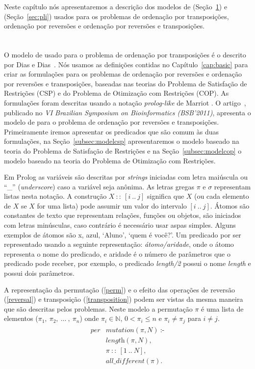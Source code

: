 Neste capítulo nós apresentaremos a descrição dos modelos de \pr{}
(Seção~\ref{sec:cp}) e \pli{} (Seção~\ref{sec:pli}) usados para os
problemas de ordenação por transposições, ordenação por reversões e
ordenação por reversões e transposições.

\section{\PR}
\label{sec:cp}
O modelo de \pr{} usado para o problema de ordenação por transposições é
o descrito por Dias e Dias~\cite{DiasDias*2009}. Nós usamos as
definições contidas no Capítulo~\ref{cap:basic} para criar as
formulações para os problemas de ordenação por reversões e ordenação por
reversões e transposições, baseadas nas teorias do Problema de
Satisfação de Restrições (CSP) e do Problema de Otimização com
Restrições (COP). As formulações foram descritas usando a notação
\textit{prolog-like} de Marriot \cite{Marriott*1998}. O
artigo~\cite{IizukaDias*2011}, publicado no \textit{VI Brazilian
Symposium on Bioinformatics (BSB'2011)}, apresenta o modelo de \pr{}
para o problema de ordenação por reversões e transposições.
Primeiramente iremos apresentar os predicados que são comum às duas
formulações, na Seção~\ref{subsec:modelcsp} apresentaremos o modelo
baseado na teoria do Problema de Satisfação de Restrições e na
Seção~\ref{subsec:modelcop} o modelo baseado na teoria do Problema de
Otimização com Restrições.

Em Prolog as variáveis são descritas por \textit{strings} iniciadas com
letra maiúscula ou ``\_'' (\textit{underscore}) caso a variável seja
anônima. As letras gregas $\pi$ e $\sigma$ representam listas nesta
notação. A construção $X~::~[i~..~j]$ significa que $X$ (ou cada
elemento de $X$ se $X$ for uma lista) pode assumir um valor do intervalo
$[i~..~j]$. Átomos são constantes de texto que representam relações,
funções ou objetos, são iniciados com letras minúsculas, caso contrário
é necessário usar aspas simples.  Alguns exemplos de átomos são x, azul,
`Aluno', `quem é você?'. Um predicado por ser representado usando a
seguinte representação: \textit{átomo/aridade}, onde o átomo representa
o nome do predicado, e aridade é o número de parâmetros que o predicado
pode receber, por exemplo, o predicado \textit{length/2} possui o nome
\textit{length} e possui dois parâmetros.

A representação da permutação (\ref{perm}) e o efeito das operações de
reversão (\ref{reversal}) e transposição (\ref{transposition}) podem ser
vistas da mesma maneira que são descritas pelos problemas. Neste modelo
a permutação $\pi$ é uma lista de elementos
($\pi_{1},~\pi_{2},~\ldots~,~\pi_{n}$) onde $\pi_{i} \in \mathbb{N}$, $0
< \pi_{i} \le n$ e $\pi_{i} \neq \pi_{j}$ para $i \neq j$.
\begin{align}
  \label{perm}
  \begin{split}
  \textit{per}&\textit{mutation}(\pi, N)~\text{:-} \\
  &\textit{length}(\pi, N), \\ 
  &\pi~::~[1~..~N], \\
  &\textit{all\_different}(\pi). 
  \end{split}
\end{align}

